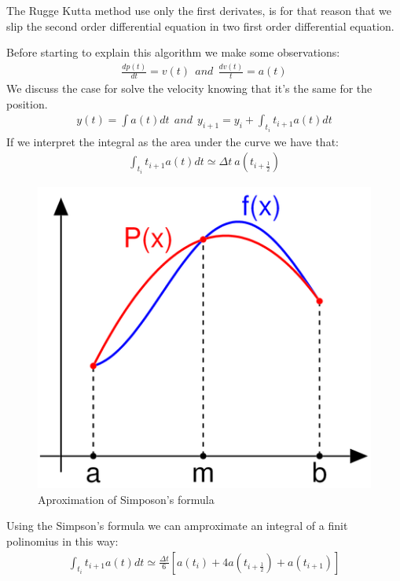 \documentclass[a4paper]{article}
\begin{document}
The Rugge Kutta method use only the first derivates, is for that reason that we slip the second order differential equation in two first order differential equation. 

Before starting to explain this algorithm we make some observations: 
\begin{align}
\frac{dp(t)}{dt} = v(t) \ \ and \ \ \frac{dv(t)}{t} = a(t) 
\end{align}
We discuss the case for solve the velocity knowing that it's the same for the position.
\begin{align}
y(t) = \int a(t)dt \ \ and \  \ y_{i+1} = y_i + \int_{t_i}{t_{i+1}} a(t)dt
\end{align}
If we interpret the integral as the area under the curve we have that:
\begin{align}
\int_{t_i}{t_{i+1}} a(t)dt \simeq \Delta t \  a(t_{i+\frac{1}{2}})
\end{align}
\begin{figure}
\includegraphics[scale=0.3]{sim_int.png}
\caption{Aproximation of Simposon's formula}
\end{figure}

Using the Simpson's formula we can amproximate an integral of a finit polinomius in this way: 
\begin{align}
\int_{t_i}{t_{i+1}} a(t)dt \simeq \frac{\Delta t}{6} \left [ a(t_i)+4a(t_{i+\frac{1}{2}})+ a(t_{i+1}) \right ] 
\end{align}
\end{document}
